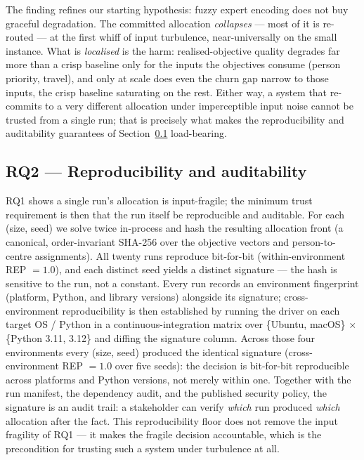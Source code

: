 \documentclass[systems,article,submit,moreauthors,pdftex]{Definitions/mdpi}
\begin{document}
The finding refines our starting hypothesis: fuzzy expert encoding does not buy graceful
degradation. The committed allocation \emph{collapses} --- most of it is re-routed --- at the
first whiff of input turbulence, near-universally on the small instance. What is
\emph{localised} is the harm: realised-objective quality degrades far more than a crisp
baseline only for the inputs the objectives consume (person priority, travel), and only at
scale does even the churn gap narrow to those inputs, the crisp baseline saturating on the
rest. Either way, a system that re-commits to a very different allocation under imperceptible
input noise cannot be trusted from a single run; that is precisely what makes the
reproducibility and auditability guarantees of Section~\ref{sec:rq2} load-bearing.

\subsection{RQ2 --- Reproducibility and auditability}\label{sec:rq2}

RQ1 shows a single run's allocation is input-fragile; the minimum trust requirement is then
that the run itself be reproducible and auditable. For each (size, seed) we solve twice
in-process and hash the resulting allocation front (a canonical, order-invariant SHA-256
over the objective vectors and person-to-centre assignments). All twenty runs reproduce
bit-for-bit (within-environment REP $= 1.0$), and each distinct seed yields a distinct
signature --- the hash is sensitive to the run, not a constant. Every run records an
environment fingerprint (platform, Python, and library versions) alongside its signature;
cross-environment reproducibility is then established by running the driver on each target OS /
Python in a continuous-integration matrix over \{Ubuntu, macOS\} $\times$ \{Python 3.11, 3.12\}
and diffing the signature column. Across those four environments every (size, seed) produced
the identical signature (cross-environment REP $= 1.0$ over five seeds): the decision is
bit-for-bit reproducible across platforms and Python versions, not merely within one. Together
with the run manifest, the dependency audit, and the
published security policy, the signature is an audit trail: a stakeholder can verify
\emph{which} run produced \emph{which} allocation after the fact. This reproducibility floor
does not remove the input fragility of RQ1 --- it makes the fragile decision accountable,
which is the precondition for trusting such a system under turbulence at all.
\end{document}
